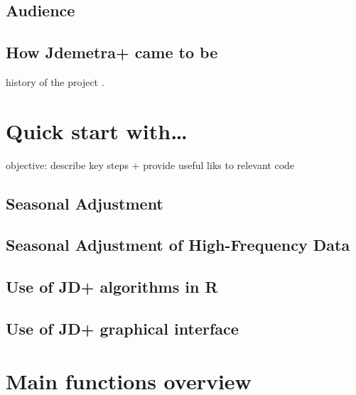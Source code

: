 \documentclass[
  letterpaper,
  DIV=11,
  numbers=noendperiod]{scrreprt}
\begin{document}
\hypertarget{audience}{%
\section{Audience}\label{audience}}

\hypertarget{how-jdemetra-came-to-be}{%
\section{How Jdemetra+ came to be}\label{how-jdemetra-came-to-be}}

history of the project .

\hypertarget{quick-start-with}{%
\chapter{Quick start with\ldots{}}\label{quick-start-with}}

objective: describe key steps + provide useful liks to relevant code

\hypertarget{seasonal-adjustment}{%
\section{Seasonal Adjustment}\label{seasonal-adjustment}}

\hypertarget{seasonal-adjustment-of-high-frequency-data}{%
\section{Seasonal Adjustment of High-Frequency
Data}\label{seasonal-adjustment-of-high-frequency-data}}

\hypertarget{use-of-jd-algorithms-in-r}{%
\section{Use of JD+ algorithms in R}\label{use-of-jd-algorithms-in-r}}

\hypertarget{use-of-jd-graphical-interface}{%
\section{Use of JD+ graphical
interface}\label{use-of-jd-graphical-interface}}

\hypertarget{main-functions-overview}{%
\chapter{Main functions overview}\label{main-functions-overview}}
\end{document}
